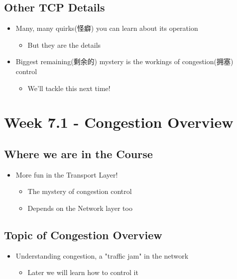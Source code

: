 \documentclass[12pt]{ctexart}   %
\begin{document}
	\subsection{Other TCP Details}
	\begin{itemize}
		\item Many, many quirks(怪癖) you can learn about its operation
		\begin{itemize}
			\item But they are the details
		\end{itemize}
		
		\item Biggest remaining(剩余的) mystery is the workings of congestion(拥塞) control
		\begin{itemize}
			\item We'll tackle this next time!
		\end{itemize}
	\end{itemize}
	
\section{Week 7.1 - Congestion Overview}
	\subsection{Where we are in the Course}
	\begin{itemize}
		\item More fun in the Transport Layer!
		\begin{itemize}
			\item The mystery of congestion control
			\item Depends on the Network layer too
		\end{itemize}
	\end{itemize}
	
	\subsection{Topic of Congestion Overview}
	\begin{itemize}
		\item Understanding congestion, a "traffic jam" in the network
		\begin{itemize}
			\item Later we will learn how to control it
		\end{itemize}
	\end{itemize}
	
\end{document}
